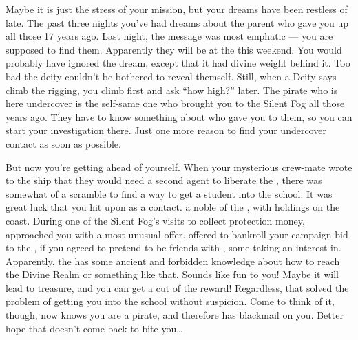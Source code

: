 \documentclass[char]{GL2020}
\begin{document}
Maybe it is just the stress of your mission, but your dreams have been restless of late. The past three nights you've had dreams about the parent who gave you up all those 17 years ago. Last night, the message was most emphatic — you are supposed to find them. Apparently they will be at the \pSc{} this weekend. You would probably have ignored the dream, except that it had divine weight behind it. Too bad the deity couldn't be bothered to reveal themself. Still, when a Deity says climb the rigging, you climb first and ask ``how high?'' later. The pirate who is here undercover is the self-same one who brought you to the Silent Fog all those years ago. They have to know something about who gave you to them, so you can start your investigation there. Just one more reason to find your undercover contact as soon as possible. 

But now you're getting ahead of yourself. When your mysterious crew-mate wrote to the ship that they would need a second agent to liberate the \iNet{}, there was somewhat of a scramble to find a way to get a student into the school. It was great luck that you hit upon \cWildCard{\full} as a contact. \cWildCard{\Theyare} a noble\cWildCard{\person} of the \pFarm{}, with holdings on the coast. During one of the Silent Fog's visits to collect protection money, \cWildCard{} approached you with a most unusual offer. \cWildCard{\They} offered to bankroll your campaign bid to the \pSchool{}, if you agreed to pretend to be friends with \cDisney{\full}, some \cDisney{\kid} \cWildCard{\they} \cWildCard{\were} taking an interest in. Apparently, the \cDisney{\kid} has some ancient and forbidden knowledge about how to reach the Divine Realm or something like that. Sounds like fun to you! Maybe it will lead to treasure, and you can get a cut of the reward! Regardless, that solved the problem of getting you into the school without suspicion. Come to think of it, though, \cWildCard{} now knows you are a pirate, and therefore has blackmail on you. Better hope that doesn't come back to bite you\ldots{}
\end{document}

